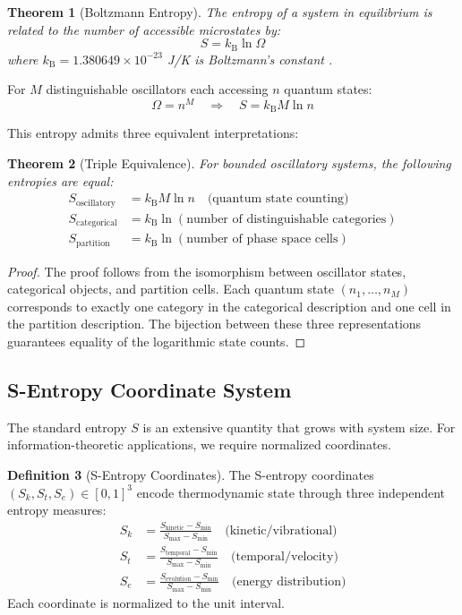 \documentclass[twocolumn,10pt,a4paper]{article}
\newtheorem{theorem}{Theorem}[section]
\theoremstyle{definition}
\newtheorem{definition}[theorem]{Definition}
\theoremstyle{remark}
\newcommand{\kB}{k_{\mathrm{B}}}
\begin{document}
\begin{theorem}[Boltzmann Entropy]
\label{thm:boltzmann}
The entropy of a system in equilibrium is related to the number of accessible microstates by:
\begin{equation}
    S = \kB \ln \Omega
\end{equation}
where $\kB = 1.380649 \times 10^{-23}$ J/K is Boltzmann's constant \cite{codata2018}.
\end{theorem}

For $M$ distinguishable oscillators each accessing $n$ quantum states:
\begin{equation}
    \Omega = n^M \quad \Rightarrow \quad S = \kB M \ln n
\end{equation}

This entropy admits three equivalent interpretations:

\begin{theorem}[Triple Equivalence]
\label{thm:triple}
For bounded oscillatory systems, the following entropies are equal:
\begin{align}
    S_{\text{oscillatory}} &= \kB M \ln n \quad \text{(quantum state counting)} \\
    S_{\text{categorical}} &= \kB \ln(\text{number of distinguishable categories}) \\
    S_{\text{partition}} &= \kB \ln(\text{number of phase space cells})
\end{align}
\end{theorem}

\begin{proof}
The proof follows from the isomorphism between oscillator states, categorical objects, and partition cells. Each quantum state $(n_1, \ldots, n_M)$ corresponds to exactly one category in the categorical description and one cell in the partition description. The bijection between these three representations guarantees equality of the logarithmic state counts.
\end{proof}

\subsection{S-Entropy Coordinate System}

The standard entropy $S$ is an extensive quantity that grows with system size. For information-theoretic applications, we require normalized coordinates.

\begin{definition}[S-Entropy Coordinates]
\label{def:s_entropy}
The S-entropy coordinates $(S_k, S_t, S_e) \in [0,1]^3$ encode thermodynamic state through three independent entropy measures:
\begin{align}
    S_k &= \frac{S_{\text{kinetic}} - S_{\min}}{S_{\max} - S_{\min}} \quad \text{(kinetic/vibrational)} \\
    S_t &= \frac{S_{\text{temporal}} - S_{\min}}{S_{\max} - S_{\min}} \quad \text{(temporal/velocity)} \\
    S_e &= \frac{S_{\text{evolution}} - S_{\min}}{S_{\max} - S_{\min}} \quad \text{(energy distribution)}
\end{align}
Each coordinate is normalized to the unit interval.
\end{definition}
\end{document}
